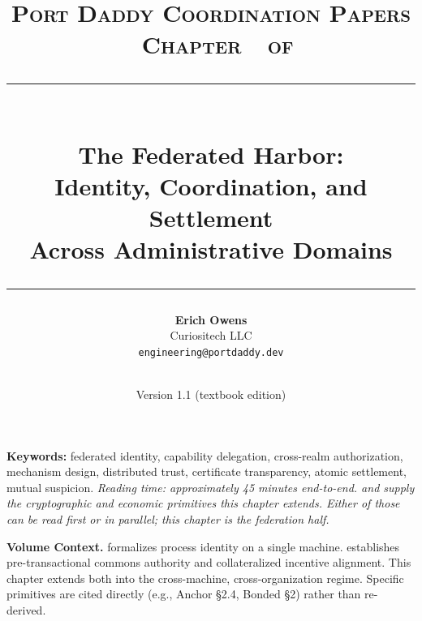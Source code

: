 \documentclass[11pt,a4paper]{article}
\title{
  \vspace{-1cm}
  {\Large\textsc{Port Daddy Coordination Papers \textperiodcentered\ Chapter~\pdchapternumber\ of \pdchaptercount}}\\[
0.5cm]
  \rule{\textwidth}{0.5pt}\\[0.3cm]
  {\LARGE\textbf{The Federated Harbor:}}\\[0.2cm]
  {\Large Identity, Coordination, and Settlement\\Across Administrative Domains}\\[0.3cm]
  \rule{\textwidth}{0.5pt}
}
\author{
  \textbf{Erich Owens}\\[0.2cm]
  Curiositech LLC\\[0.2cm]
  \texttt{engineering@portdaddy.dev}
}
\date{\pdeditiondate\\Version 1.1 (textbook edition)}
\theoremstyle{definition}
\theoremstyle{remark}
\begin{document}
\pdopensolutions
\setlength{\emergencystretch}{2em}
\maketitle
\thispagestyle{empty}
\vspace{1cm}
\vspace{0.5cm}
\noindent\textbf{Keywords:} federated identity, capability delegation, cross-realm authorization, mechanism design, distributed trust, certificate transparency, atomic settlement, mutual suspicion.
\vspace{0.4cm}
\noindent\textit{Reading time: approximately 45 minutes end-to-end.  and  supply the cryptographic and economic primitives this chapter extends. Either of those can be read first or in parallel; this chapter is the federation half.}
\vspace{0.6cm}
\begin{center}
\end{center}
\vspace{0.4cm}
\vspace{0.5cm}
\noindent\textbf{Volume Context.}  formalizes process identity on a single machine.  establishes pre-transactional commons authority and collateralized incentive alignment. This chapter extends both into the cross-machine, cross-organization regime. Specific primitives are cited directly (e.g., Anchor \S2.4, Bonded \S2) rather than re-derived.
\newpage
\tableofcontents
\newpage
\end{document}
